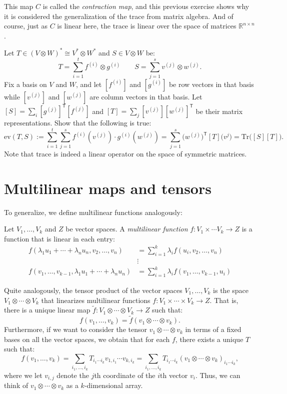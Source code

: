 This map $C$ is called the \emph{contraction map}, and this previous exercise shows why it is considered the generalization of the trace from matrix algebra. And of course, just as $C$ is linear here, the trace is linear over the space of matrices $\mathbb{R}^{n \times n}$.

\begin{exercise}
  Let $T \in (V \otimes W)^* \cong V^* \otimes W^*$ and $S \in V \otimes W$ be:
  \[T = \sum_{i=1}^t f^{(i)} \otimes g^{(i)} \quad \quad S = \sum_{j=1}^s v^{(j)} \otimes w^{(j)}.\]
  Fix a basis on $V$ and $W$, and let $[f^{(i)}]$ and $[g^{(i)}]$ be row vectors in that basis while $[v^{(j)}]$ and $[w^{(j)}]$ are column vectors in that basis. Let $[S] = \sum_i [g^{(j)}]^{\mathsf{T}} [f^{(j)}]$ and $[T] = \sum_j [v^{(j)}][w^{(j)}]^\mathsf{T}$ be their matrix representations. Show that the following is true:
  \[\mathrm{ev}(T,S) := \sum_{i=1}^t \sum_{j=1}^s f^{(i)}(v^{(j)}) \cdot g^{(i)}(w^{(j)}) = \sum_{j=1}^s \big(w^{(j)}\big)^{\mathsf{T}}[T]\big(v^{j}\big) = \mathrm{Tr}\big([S][T]\big).\]
  Note that trace is indeed a linear operator on the space of symmetric matrices.
\end{exercise}



\section{Multilinear maps and tensors}
To generalize, we define multilinear functions analogously: 
\begin{definition}
  Let $V_1,\dotsc, V_k$ and $Z$ be vector spaces. A \emph{multilinear function} $f : V_1\times \dotsm V_k \to Z$ is a function that is linear in each entry:
    \begin{align*}
      f(\lambda_1u_1 + \dotsm + \lambda_n u_n, v_2,\dotsc, v_n) &= \sum_{i=1}^k \lambda_i f(u_i,v_2,\dotsc, v_n)\\
      &\vdots \\
      f(v_1, \dotsc,v_{k-1},\lambda_1u_1 + \dotsm + \lambda_n u_n) &= \sum_{i=1}^k \lambda_i f(v_1,\dotsc,v_{k-1}, u_i)
    \end{align*}
\end{definition}
Quite analogously, the tensor product of the vector spaces $V_1,\dotsc, V_k$ is the space $V_1 \otimes \dotsm \otimes V_k$ that linearizes multilinear functions $f : V_1 \times \dotsm \times V_k \to Z$. That is, there is a unique linear map $\tilde{f}: V_1 \otimes \dotsm \otimes V_k \to Z$ such that:
\[f(v_1,\dotsc, v_k) = \tilde{f}(v_1 \otimes \dotsm \otimes v_k).\]
Furthermore, if we want to consider the tensor $v_1 \otimes \dotsm \otimes v_k$ in terms of a fixed bases on all the vector spaces, we obtain that for each $f$, there exists a unique $T$ such that:
\[f(v_1,\dotsc, v_k) = \sum_{i_1,\dotsc, i_k} T_{i_1\dotsm i_k} v_{1,i_1} \dotsm v_{k,i_k} = \sum_{i_1,\dotsc, i_k} T_{i_1\dotsm i_k} (v_1\otimes \dotsm \otimes v_k)_{i_1\dotsm i_k},\]
where we let $v_{i,j}$ denote the $j$th coordinate of the $i$th vector $v_i$. Thus, we can think of $v_1 \otimes \dotsm \otimes v_k$ as a $k$-dimensional array.




